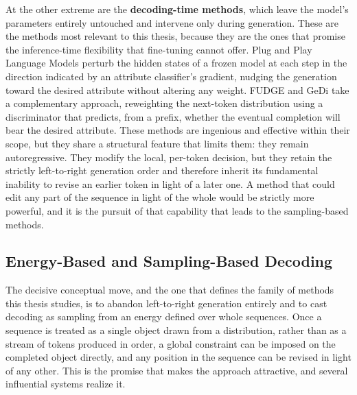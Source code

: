 At the other extreme are the \textbf{decoding-time methods}, which leave the model's parameters entirely untouched and intervene only during generation. These are the methods most relevant to this thesis, because they are the ones that promise the inference-time flexibility that fine-tuning cannot offer. Plug and Play Language Models \citep{dathathri2020plug} perturb the hidden states of a frozen model at each step in the direction indicated by an attribute classifier's gradient, nudging the generation toward the desired attribute without altering any weight. FUDGE \citep{yang2021fudge} and GeDi \citep{krause2021gedi} take a complementary approach, reweighting the next-token distribution using a discriminator that predicts, from a prefix, whether the eventual completion will bear the desired attribute. These methods are ingenious and effective within their scope, but they share a structural feature that limits them: they remain autoregressive. They modify the local, per-token decision, but they retain the strictly left-to-right generation order and therefore inherit its fundamental inability to revise an earlier token in light of a later one. A method that could edit any part of the sequence in light of the whole would be strictly more powerful, and it is the pursuit of that capability that leads to the sampling-based methods.

\subsection{Energy-Based and Sampling-Based Decoding}
\label{sec:rel-energy}

The decisive conceptual move, and the one that defines the family of methods this thesis studies, is to abandon left-to-right generation entirely and to cast decoding as sampling from an energy defined over whole sequences. Once a sequence is treated as a single object drawn from a distribution, rather than as a stream of tokens produced in order, a global constraint can be imposed on the completed object directly, and any position in the sequence can be revised in light of any other. This is the promise that makes the approach attractive, and several influential systems realize it.

